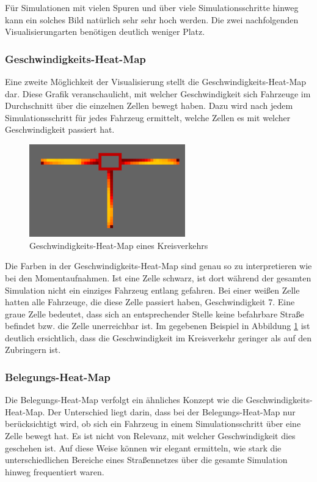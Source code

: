\documentclass[11pt, a4paper]{article}
\begin{document}
Für Simulationen mit vielen Spuren und über viele Simulationsschritte hinweg kann ein solches Bild natürlich sehr sehr hoch werden. Die zwei nachfolgenden Visualisierungarten benötigen deutlich weniger Platz.

\subsubsection{Geschwindigkeits-Heat-Map}
\label{subsubsec:speedmap}

Eine zweite Möglichkeit der Visualisierung stellt die Geschwindigkeits-Heat-Map dar. Diese Grafik veranschaulicht, mit welcher Geschwindigkeit sich Fahrzeuge im Durchschnitt über die einzelnen Zellen bewegt haben. Dazu wird nach jedem Simulationsschritt für jedes Fahrzeug ermittelt, welche Zellen es mit welcher Geschwindigkeit passiert hat.

\begin{figure}[h!]
	\centering
	\includegraphics[height=4cm]{img/vis_roundabout_speed_heat_map}
	\caption{Geschwindigkeits-Heat-Map eines Kreisverkehrs}
	\label{fig:speedMapRoundabout}
\end{figure}

Die Farben in der Geschwindigkeits-Heat-Map sind genau so zu interpretieren wie bei den Momentaufnahmen. Ist eine Zelle schwarz, ist dort während der gesamten Simulation nicht ein einziges Fahrzeug entlang gefahren. Bei einer weißen Zelle hatten alle Fahrzeuge, die diese Zelle passiert haben, Geschwindigkeit 7. Eine graue Zelle bedeutet, dass sich an entsprechender Stelle keine befahrbare Straße befindet bzw. die Zelle unerreichbar ist. Im gegebenen Beispiel in Abbildung \ref{fig:speedMapRoundabout} ist deutlich ersichtlich, dass die Geschwindigkeit im Kreisverkehr geringer als auf den Zubringern ist.

\subsubsection{Belegungs-Heat-Map}
\label{subsubsec:occupancymap}

Die Belegungs-Heat-Map verfolgt ein ähnliches Konzept wie die Geschwindigkeits-Heat-Map. Der Unterschied liegt darin, dass bei der Belegungs-Heat-Map nur berücksichtigt wird, ob sich ein Fahrzeug in einem Simulationsschritt über eine Zelle bewegt hat. Es ist nicht von Relevanz, mit welcher Geschwindigkeit dies geschehen ist. Auf diese Weise können wir elegant ermitteln, wie stark die unterschiedlichen Bereiche eines Straßennetzes über die gesamte Simulation hinweg frequentiert waren.
\end{document}
